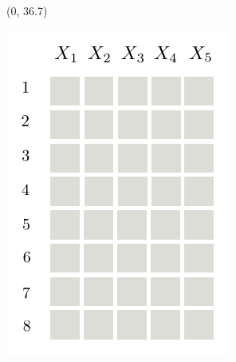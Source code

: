 \documentclass[final]{beamer}
\begin{document}
\begin{frame}{}
\begin{textblock}{25.2}
 
  \end{textblock}
  
  
  \begin{textblock}{60}(0, 36.7)
    \small
    \begin{minipage}[t][][t]{5.67cm}
      \includegraphics[width=\linewidth]{figures/grid-0}
    \end{minipage}\hspace{30pt}\begin{minipage}[t]{4.986cm}

\end{minipage}
\end{textblock}
\end{frame}
\end{document}
